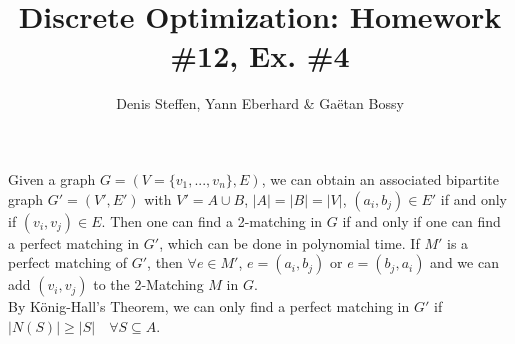 \documentclass[a4paper,11pt,french]{article}
\title{Discrete Optimization: Homework \#12, Ex. \#4}
\author{Denis Steffen, Yann Eberhard \& Gaëtan Bossy}
\begin{document}
    
    \maketitle
Given a graph $G=(V=\{v_1,...,v_n\},E)$, we can obtain an associated bipartite graph $G'=(V',E')$ with $V'=A\cup B$, $|A|=|B|=|V|$, $(a_i,b_j)\in E'$ if and only if $(v_i,v_j)\in E$. Then one can find a 2-matching in $G$ if and only if one can find a perfect matching in $G'$, which can be done in polynomial time. If $M'$ is a perfect matching of $G'$, then $\forall e\in M'$, $e=(a_i,b_j)$ or $e=(b_j,a_i)$ and we can add $(v_i,v_j)$ to the 2-Matching $M$ in $G$.\\

By König-Hall's Theorem, we can only find a perfect matching in $G'$ if $|N(S)|\geq|S|\quad \forall S\subseteq A$.

  
\end{document}
